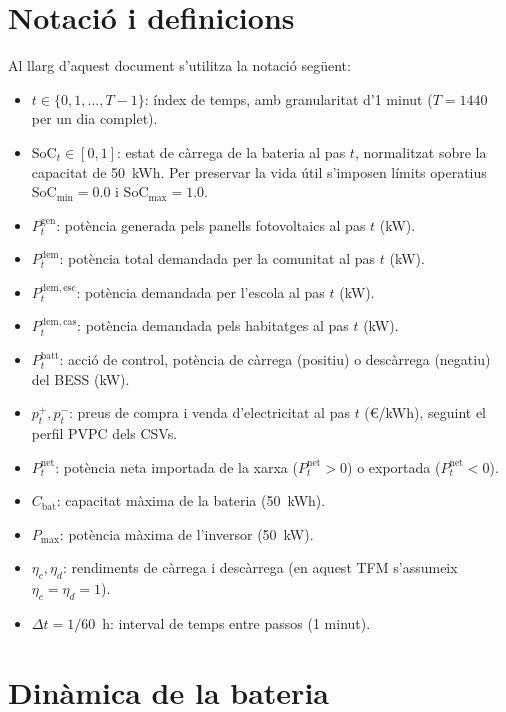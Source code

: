 \documentclass[a4paper,12pt,twoside]{ThesisStyle}
\begin{document}
\section{Notació i definicions}

Al llarg d'aquest document s'utilitza la notació següent:

\begin{itemize}
    \item $t \in \{0, 1, \ldots, T-1\}$: índex de temps, amb granularitat d'1 minut ($T = 1440$ per un dia complet).
    \item $\mathrm{SoC}_t \in [0, 1]$: estat de càrrega de la bateria al pas $t$, normalitzat sobre la capacitat de 50~kWh. Per preservar la vida útil s'imposen límits operatius $\mathrm{SoC}_{\min} = 0.0$ i $\mathrm{SoC}_{\max} = 1.0$.
    \item $P_t^{\mathrm{gen}}$: potència generada pels panells fotovoltaics al pas $t$ (kW).
    \item $P_t^{\mathrm{dem}}$: potència total demandada per la comunitat al pas $t$ (kW).
    \item $P_t^{\mathrm{dem,esc}}$: potència demandada per l'escola al pas $t$ (kW).
    \item $P_t^{\mathrm{dem,cas}}$: potència demandada pels habitatges al pas $t$ (kW).
    \item $P_t^{\mathrm{batt}}$: acció de control, potència de càrrega (positiu) o descàrrega (negatiu) del BESS (kW).
    \item $p_t^{+}, p_t^{-}$: preus de compra i venda d'electricitat al pas $t$ (€/kWh), seguint el perfil PVPC dels CSVs.
    \item $P_t^{\mathrm{net}}$: potència neta importada de la xarxa ($P_t^{\mathrm{net}} > 0$) o exportada ($P_t^{\mathrm{net}} < 0$).
    \item $C_{\mathrm{bat}}$: capacitat màxima de la bateria (50~kWh).
    \item $P_{\mathrm{max}}$: potència màxima de l'inversor (50~kW).
    \item $\eta_c, \eta_d$: rendiments de càrrega i descàrrega (en aquest TFM s'assumeix $\eta_c = \eta_d = 1$).
    \item $\Delta t = 1/60$~h: interval de temps entre passos (1 minut).
\end{itemize}

\section{Dinàmica de la bateria}
\end{document}
